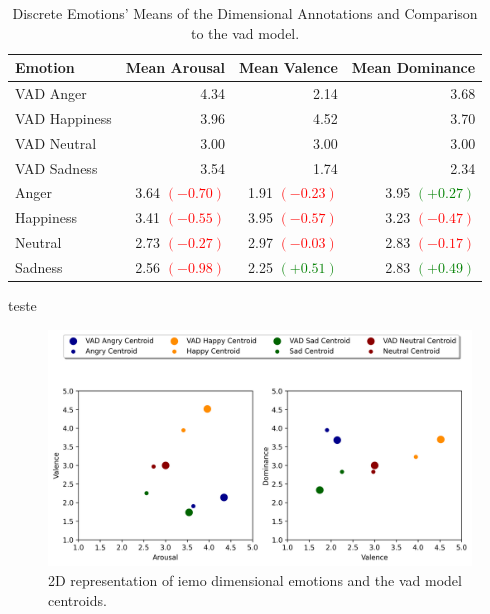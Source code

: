 \begin{table}[H]
	\centering
	\caption{Discrete Emotions' Means of the Dimensional Annotations and Comparison to the \ac{vad} model.}
	\label{tab:dis_dim}
	\begin{tabular}{lrrr}
		\toprule
		Emotion & Mean Arousal &   Mean Valence & Mean Dominance \\
		\midrule
		VAD Anger     & 4.34 & 2.14 & 3.68 \\
		VAD Happiness & 3.96 & 4.52 & 3.70 \\
		VAD Neutral   & 3.00 & 3.00 & 3.00 \\
		VAD Sadness   & 3.54 & 1.74 & 2.34 \\
		\addlinespace
		Anger   	&   3.64 \textcolor{red}{$(-0.70)$} &  1.91 \textcolor{red}{$(-0.23)$} &  3.95 \textcolor{green}{$(+0.27)$} \\
		Happiness   &   3.41 \textcolor{red}{$(-0.55)$} &  3.95 \textcolor{red}{$(-0.57)$} &  3.23 \textcolor{red}{$(-0.47)$} \\
		Neutral 	&   2.73 \textcolor{red}{$(-0.27)$} &  2.97 \textcolor{red}{$(-0.03)$} &  2.83 \textcolor{red}{$(-0.17)$} \\
		Sadness     &   2.56 \textcolor{red}{$(-0.98)$} &  2.25 \textcolor{green}{$(+0.51)$} &  2.83 \textcolor{green}{$(+0.49)$} \\
		\bottomrule
	\end{tabular}
\end{table}

teste

\begin{figure}[H]
  \centering
  \includegraphics[width=.9\linewidth]{figs/5_data_stratification/primitives_visualization_2d.png}
  \caption{2D representation of \ac{iemo} dimensional emotions and the \ac{vad} model centroids.}
  \label{fig:2dplane}
\end{figure}

